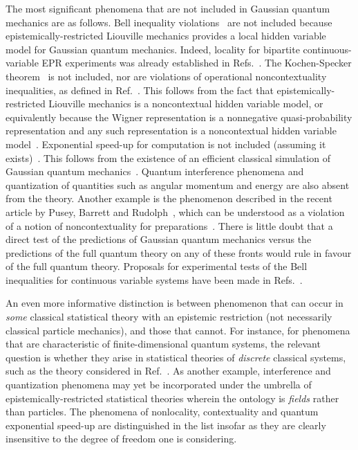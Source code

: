 \documentclass[pra,superscriptaddress,nofootinbib,12pt]{revtex4-2}
\begin{document}
The most significant phenomena that are not included in Gaussian quantum mechanics are as follows.  Bell inequality violations~\cite{Bell64} are not included because epistemically-restricted Liouville mechanics provides a local hidden variable model for Gaussian quantum mechanics.  Indeed, locality for bipartite continuous-variable EPR experiments was already established in Refs.~\cite{BellEPR,OuCVBell}. The Kochen-Specker theorem~\cite{KS67} is not included, nor are violations of operational noncontextuality inequalities, as defined in Ref.~\cite{Spe09}.  This follows from the fact that epistemically-restricted Liouville mechanics is a noncontextual hidden variable model, or equivalently because the Wigner representation is a nonnegative quasi-probability representation and any such representation is a noncontextual hidden variable model~\cite{Spe08}.  Exponential speed-up for computation is not included (assuming it exists)~\cite{Nie00}.  This follows from the existence of an efficient classical simulation of Gaussian quantum mechanics~\cite{Bar02}. Quantum interference phenomena and quantization of quantities such as angular momentum and energy are also absent from the theory.   Another example is the phenomenon described in the recent article by Pusey, Barrett and Rudolph~\cite{PBR11}, which can be understood as a violation of a notion of noncontextuality for preparations~\cite{Spe05}.   There is little doubt that a direct test of the predictions of Gaussian quantum mechanics versus the predictions of the full quantum theory on any of these fronts would rule in favour of the full quantum theory.  Proposals for experimental tests of the Bell inequalities for continuous variable systems have been made in Refs.~\cite{Cavalcanti07,He10,Leonhardt95,Gilchrist98,Yurke99,Yurke01}.

An even more informative distinction is between phenomenon that can occur in \emph{some} classical statistical theory with an epistemic restriction (not necessarily classical particle mechanics), and those that cannot. For instance, for phenomena that are characteristic of finite-dimensional quantum systems, the relevant question is whether they arise in statistical theories of \emph{discrete} classical systems, such as the theory considered in Ref.~\cite{Spe07}.  As another example, interference and quantization phenomena may yet be incorporated under the umbrella of epistemically-restricted statistical theories wherein the ontology is \emph{fields} rather than particles.  The phenomena of nonlocality, contextuality and quantum exponential speed-up are distinguished in the list insofar as they are clearly insensitive to the degree of freedom one is considering.
\end{document}
